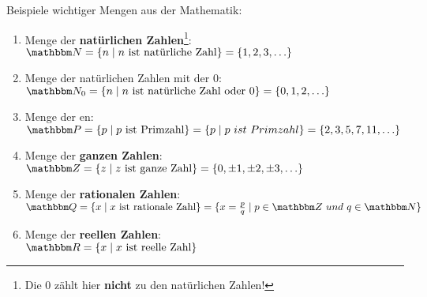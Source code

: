 \begin{Unit}
Beispiele wichtiger Mengen aus der Mathematik:
\begin{enumerate}
\item Menge der \textbf{natürlichen Zahlen}\footnote{Die 0 zählt hier
  \textbf{nicht} zu den natürlichen Zahlen!}: \\
  $\NN = \{ n \mid n\text{ ist natürliche Zahl} \} = \{ 1, 2, 3, \ldots \} $
  
\item Menge der natürlichen Zahlen mit der $0$: \\
  $\NN_0 = \{ n \mid n\text{ ist natürliche Zahl oder }0 \}
  = \{ 0, 1, 2, \ldots \}  $
  
\item Menge der en: \\
  $\PP = \{ p \mid p\text{ ist Primzahl} \} 
    =\{p \mid p\ ist\ Primzahl\} 
            = \{ 2, 3, 5, 7, 11, \ldots \} $

\item Menge der \textbf{ganzen Zahlen}: \\
  $\ZZ = \{z \mid z\text{ ist ganze Zahl}\} 
            = \{ 0, \pm 1, \pm 2, \pm 3, \ldots \} $

\item Menge der \textbf{rationalen Zahlen}: \\
  $\QQ = \{ x \mid x\text{ ist rationale Zahl}\}
            = \{ x = \frac{p}{q} \mid p \in \ZZ\ und\ q \in \NN \} $

\item Menge der \textbf{reellen Zahlen}: \\
  $\RR = \{ x \mid x\text{ ist reelle Zahl} \} $
\end{enumerate}
\end{Unit}

